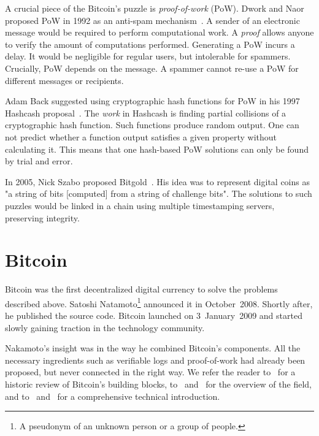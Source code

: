 A crucial piece of the Bitcoin's puzzle is \textit{proof-of-work} (PoW).
Dwork and Naor proposed PoW in 1992 as an anti-spam mechanism~\cite{Dwork1992}.
A sender of an electronic message would be required to perform computational work.
A \textit{proof} allows anyone to verify the amount of computations performed.
Generating a PoW incurs a delay.
It would be negligible for regular users, but intolerable for spammers.
Crucially, PoW depends on the message.
A spammer cannot re-use a PoW for different messages or recipients.

Adam Back suggested using cryptographic hash functions for PoW in his 1997 Hashcash proposal~\cite{Back1997}.
The \textit{work} in Hashcash is finding partial collisions of a cryptographic hash function.
Such functions produce random output.
One can not predict whether a function output satisfies a given property without calculating it.
This means that one hash-based PoW solutions can only be found by trial and error.

In 2005, Nick Szabo proposed Bitgold~\cite{Szabo2005}.
His idea was to represent digital coins as "a string of bits [computed] from a string of challenge bits".
The solutions to such puzzles would be linked in a chain using multiple timestamping servers, preserving integrity.


\section{Bitcoin}

Bitcoin was the first decentralized digital currency to solve the problems described above.
Satoshi Natamoto\footnote{A pseudonym of an unknown person or a group of people.} announced it in October~2008.
Shortly after, he published the source code.
Bitcoin launched on 3~January~2009 and started slowly gaining traction in the technology community.

Nakamoto's insight was in the way he combined Bitcoin's components.
All the necessary ingredients such as verifiable logs and proof-of-work had already been proposed, but never connected in the right way.
We refer the reader to~\cite{Narayanan2017} for a historic review of Bitcoin's building blocks, to~\cite{Bonneau2015} and~\cite{Tschorsch2016} for the overview of the field, and to~\cite{Narayanan2016} and~\cite{Antonopoulos2014} for a comprehensive technical introduction.

